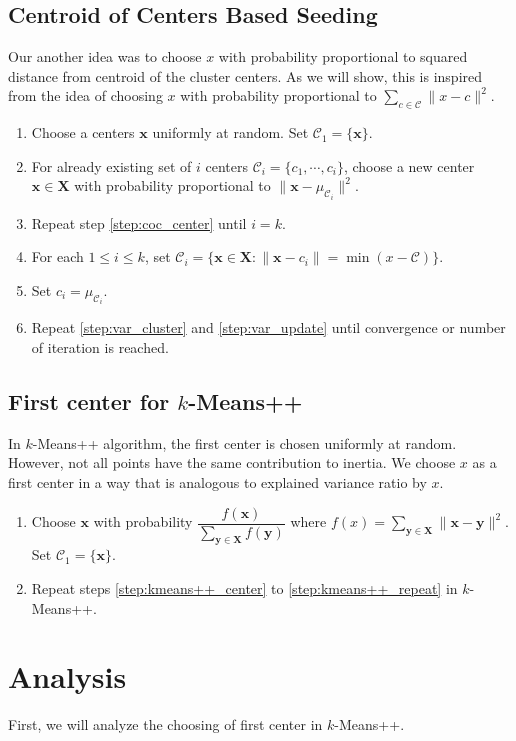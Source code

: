 \documentclass[twoside, 11pt]{article}
\newcommand{\x}{\mathbf{x}}
\newcommand{\X}{\mathbf{X}}
\newcommand{\y}{\mathbf{y}}
\newcommand{\C}{\mathcal{C}}
\begin{document}
	\subsection{Centroid of Centers Based Seeding}
	Our another idea was to choose $x$ with probability proportional to squared distance from centroid of the cluster centers. As we will show, this is inspired from the idea of choosing $x$ with probability proportional to $\sum_{c\in\C}\|x-c\|^2$.
		\begin{enumerate}[i]
			\item Choose a centers $\x$ uniformly at random. Set $\C_1=\{\x\}$.
			\item For already existing set of $i$ centers $\mathcal{C}_i=\{c_1,\cdots,c_i\}$, choose a new center $\x\in\X$ with probability proportional to $\|\x-\mu_{\C_i}\|^2$.\label{step:coc_center}
			\item Repeat step \eqref{step:coc_center} until $i=k$.
			\item For each $1\leq i\leq k$, set $\C_i=\{\x\in\X:\|\x-c_i\|=\min(x-\C)\}$.\label{step:coc_cluster}
			\item Set $c_i=\mu_{\C_i}$.\label{step:coc_update}
			\item Repeat \eqref{step:var_cluster} and \eqref{step:var_update} until convergence or number of iteration is reached.
		\end{enumerate}
	\subsection{First center for $k$-Means++}
	In $k$-Means++ algorithm, the first center is chosen uniformly at random. However, not all points have the same contribution to inertia. We choose $x$ as a first center in a way that is analogous to explained variance ratio by $x$.
		\begin{enumerate}[i]
			\item Choose $\x$ with probability $\dfrac{f(\x)}{\sum_{\y\in\X}f(\y)}$ where $f(x)=\sum_{\y\in\X}\|\x-\y\|^2$. Set $\C_1=\{\x\}$.
			\item Repeat steps \eqref{step:kmeans++_center} to \eqref{step:kmeans++_repeat} in $k$-Means++.
		\end{enumerate}
	\section{Analysis}
	First, we will analyze the choosing of first center in $k$-Means++. 
\end{document}
